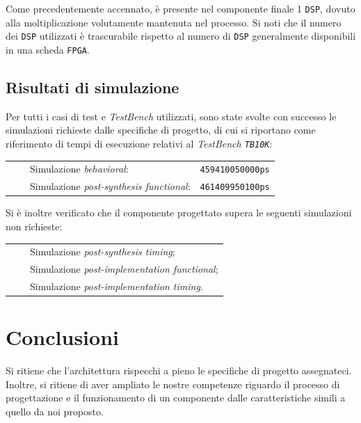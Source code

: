 \documentclass{article}
\newcommand{\tabitem}{~~\llap{\textbullet}~~}
\begin{document}
Come precedentemente accennato, è presente nel componente finale 1 \texttt{DSP}, dovuto alla moltiplicazione volutamente mantenuta nel processo. Si noti che il numero dei \texttt{DSP} utilizzati è trascurabile rispetto al numero di \texttt{DSP} generalmente disponibili in una scheda \texttt{FPGA}.
\vspace{0,2cm}

\subsection{Risultati di simulazione}
Per tutti i casi di test e \emph{TestBench} utilizzati, sono state svolte con successo le simulazioni richieste dalle specifiche di progetto, di cui si riportano come riferimento di tempi di esecuzione relativi al \emph{TestBench \texttt{TB10K}}:\par
\def\arraystretch{1.3} %
\begin{tabular}{m{8cm} m{3cm}}
    \tabitem Simulazione \emph{behavioral}:                & \texttt{459410050000ps} \\
    \tabitem Simulazione \emph{post-synthesis functional}: & \texttt{461409950100ps} \\
\end{tabular}\vspace{0,2cm}

Si è inoltre verificato che il componente progettato supera le seguenti simulazioni non richieste:\par
\def\arraystretch{1.3} %
\begin{tabular}{m{8cm}}
    \tabitem Simulazione \emph{post-synthesis timing};          \\
    \tabitem Simulazione \emph{post-implementation functional}; \\
    \tabitem Simulazione \emph{post-implementation timing}.     \\
\end{tabular}\vspace{1cm}

\section{Conclusioni}
Si ritiene che l’architettura rispecchi a pieno le specifiche di progetto assegnateci. Inoltre, si ritiene di aver ampliato le nostre competenze riguardo il processo di progettazione e il funzionamento di un componente dalle caratteristiche simili a quello da noi proposto.

\clearpage
\end{document}
